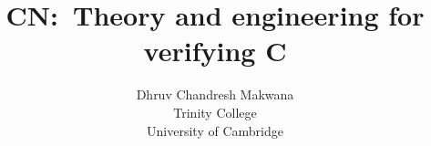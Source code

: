 
\title[CN:\ Theory and engineering for verifying C]{CN:\ Theory and engineering for verifying C}
\author[Dhruv Chandresh Makwana]{Dhruv Chandresh Makwana \\ Trinity College \\ University of Cambridge}%
\date{\monthyear}
\publishers{This dissertation is submitted for the degree of Doctor of Philosophy}


\frontmatter%


%
%
%
%
%
%
%
%


